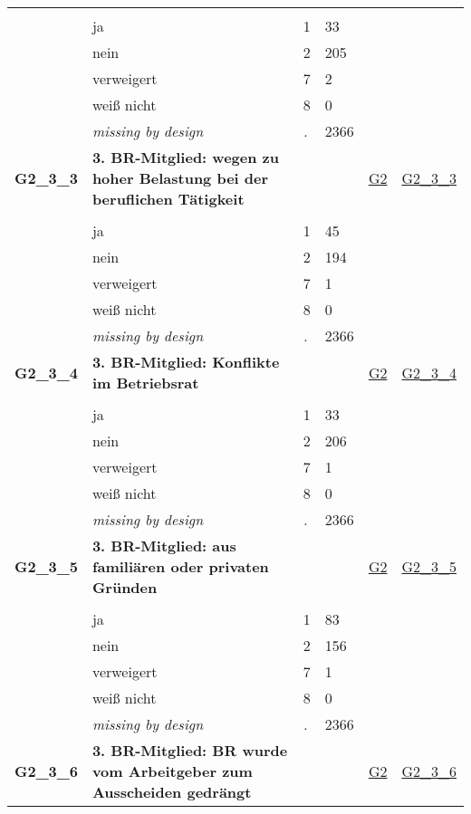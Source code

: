 \begin{longtable}{| L{2.45cm} | L{6cm} | C{1.5cm} | R{1cm} | C{2.25cm} | C{2.25cm} |}
   &  &  &  &  &  \\ 
   & ja & 1 & 33 &  &  \\ 
   & nein & 2 & 205 &  &  \\ 
   & verweigert & 7 & 2 &  &  \\ 
   & weiß nicht & 8 & 0 &  &  \\ 
   & \textit{missing by design} & \textit{.} & 2366 &  &  \\ 
   \midrule
\textbf{G2\_3\_3}\label{var:G2:3:3} & \textbf{3. BR-Mitglied: wegen zu hoher Belastung bei der beruflichen Tätigkeit} &  &  & \hyperref[G2]{G2} & \hyperref[var:suf:G2:3:3]{G2\_3\_3} \\ 
   &  &  &  &  &  \\ 
   & ja & 1 & 45 &  &  \\ 
   & nein & 2 & 194 &  &  \\ 
   & verweigert & 7 & 1 &  &  \\ 
   & weiß nicht & 8 & 0 &  &  \\ 
   & \textit{missing by design} & \textit{.} & 2366 &  &  \\ 
   \midrule
\textbf{G2\_3\_4}\label{var:G2:3:4} & \textbf{3. BR-Mitglied: Konflikte im Betriebsrat} &  &  & \hyperref[G2]{G2} & \hyperref[var:suf:G2:3:4]{G2\_3\_4} \\ 
   &  &  &  &  &  \\ 
   & ja & 1 & 33 &  &  \\ 
   & nein & 2 & 206 &  &  \\ 
   & verweigert & 7 & 1 &  &  \\ 
   & weiß nicht & 8 & 0 &  &  \\ 
   & \textit{missing by design} & \textit{.} & 2366 &  &  \\ 
   \midrule
\textbf{G2\_3\_5}\label{var:G2:3:5} & \textbf{3. BR-Mitglied: aus familiären oder privaten Gründen} &  &  & \hyperref[G2]{G2} & \hyperref[var:suf:G2:3:5]{G2\_3\_5} \\ 
   &  &  &  &  &  \\ 
   & ja & 1 & 83 &  &  \\ 
   & nein & 2 & 156 &  &  \\ 
   & verweigert & 7 & 1 &  &  \\ 
   & weiß nicht & 8 & 0 &  &  \\ 
   & \textit{missing by design} & \textit{.} & 2366 &  &  \\ 
   \midrule
\textbf{G2\_3\_6}\label{var:G2:3:6} & \textbf{3. BR-Mitglied: BR wurde vom Arbeitgeber zum Ausscheiden gedrängt} &  &  & \hyperref[G2]{G2} & \hyperref[var:suf:G2:3:6]{G2\_3\_6} \\ 

\end{longtable}
